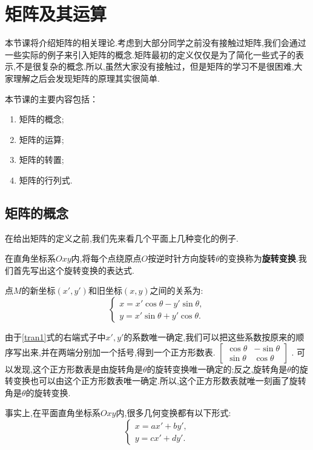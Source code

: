 \chapter{矩阵及其运算}\label{ch:2.1}

本节课将介绍矩阵的相关理论.考虑到大部分同学之前没有接触过矩阵,我们会通过一些实际的例子来引入矩阵的概念.矩阵最初的定义仅仅是为了简化一些式子的表示,不是很复杂的概念.所以,虽然大家没有接触过，但是矩阵的学习不是很困难,大家理解之后会发现矩阵的原理其实很简单.

本节课的主要内容包括：
\begin{enumerate}
	\item 矩阵的概念;
	\item 矩阵的运算;
	\item 矩阵的转置;
	\item 矩阵的行列式.
\end{enumerate}

\section{矩阵的概念}
在给出矩阵的定义之前,我们先来看几个平面上几种变化的例子.
\begin{example}
	在直角坐标系$Oxy$内,将每个点绕原点$O$按逆时针方向旋转$\theta$的变换称为\textbf{旋转变换}.我们首先写出这个旋转变换的表达式.

	点$M$的新坐标$\left(x',y'\right)$和旧坐标$\left(x,y\right)$之间的关系为:
	\begin{equation}\label{tran1}
		\left\{\begin{matrix}
			x=x'\cos\theta-y'\sin\theta , \\
			y={x}'\sin\theta+y'\cos\theta.
		\end{matrix}\right.
	\end{equation}

	由于\eqref{tran1}式的右端式子中$x',y'$的系数唯一确定,我们可以把这些系数按原来的顺序写出来,并在两端分别加一个括号,得到一个正方形数表.
	$\begin{bmatrix}
			\cos\theta & -\sin\theta \\
			\sin\theta & \cos\theta
		\end{bmatrix}$	.
	可以发现,这个正方形数表是由旋转角是$\theta$的旋转变换唯一确定的;反之,旋转角是$\theta$的旋转变换也可以由这个正方形数表唯一确定.所以,这个正方形数表就唯一刻画了旋转角是$\theta$的旋转变换.
\end{example}

事实上,在平面直角坐标系$Oxy$内,很多几何变换都有以下形式:
\begin{equation}\label{tran2}
	\left\{\begin{matrix}
		x=ax'+by' , \\
		y=cx'+dy'.
	\end{matrix}\right.
\end{equation}


